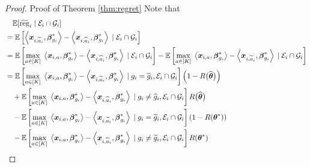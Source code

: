 \begin{proof}{Proof of Theorem \ref{thm:regret}}
Note that
\begin{equation}\label{eq:Ee}
	\begin{aligned}
		&\quad \EE[\tilde{\reg}_i\cond \cE_{i} \cap \cG_{i}]\\
		&=\EE\brackets{\angles{\bx_{i,\tilde{a}_i}, \bbeta^*_{g_i}} - \angles{\bx_{i,\hat a_i}, \bbeta^*_{g_i}} \cond \cE_{i} \cap \cG_{i} }\\
		& =\EE\brackets{\underset{a\in [K]}{\max}\; \angles{\bx_{i,a}, \bbeta^*_{g_i}} - \angles{\bx_{i,\hat a_i}, \bbeta^*_{g_i}} \cond \cE_{i} \cap \cG_{i} } - \EE\brackets{\underset{a\in [K]}{\max}\; \angles{\bx_{i,a}, \bbeta^*_{g_i}} - \angles{\bx_{i, \tilde{a}_i}, \bbeta^*_{g_i}}\cond \cE_{i} \cap \cG_{i} }\\
		& = \EE\brackets{\underset{a\in [K]}{\max}\; \angles{\bx_{i,a}, \bbeta^*_{g_i}} - \angles{\bx_{i,\hat a_i}, \bbeta^*_{g_i}} \cond g_i=\widehat{g}_i, \cE_{i} \cap \cG_{i}} \left(1-R\big(\hat{\btheta}\big)\right) \\
		&\quad + \EE\brackets{\underset{a\in [K]}{\max}\; \angles{\bx_{i,a}, \bbeta_{g_i}^*} - \angles{\bx_{i,\hat a_i}, \bbeta_{g_i}^*} \cond g_i\neq\widehat{g}_i,  \cE_{i} \cap \cG_{i}} R\big(\hat{\btheta}\big)\\
		&  \quad - \EE\brackets{\underset{a\in [K]}{\max}\; \angles{\bx_{i,a}, \bbeta^*_{g_i}} - \angles{\bx_{i,\tilde a_i}, \bbeta^*_{g_i}} \cond g_i=\tilde{g}_i,  \cE_{i} \cap \cG_{i}} \left(1-R(\btheta^*)\right)\\
		&\quad - \EE\brackets{\underset{a\in [K]}{\max}\; \angles{\bx_{i,a}, \bbeta_{g_i}^*} - \angles{\bx_{i,\tilde a_i}, \bbeta_{g_i}^*} \cond g_i\neq\tilde{g}_i,  \cE_{i} \cap \cG_{i}} R(\btheta^*)
	\end{aligned}
\end{equation}



\end{proof}
